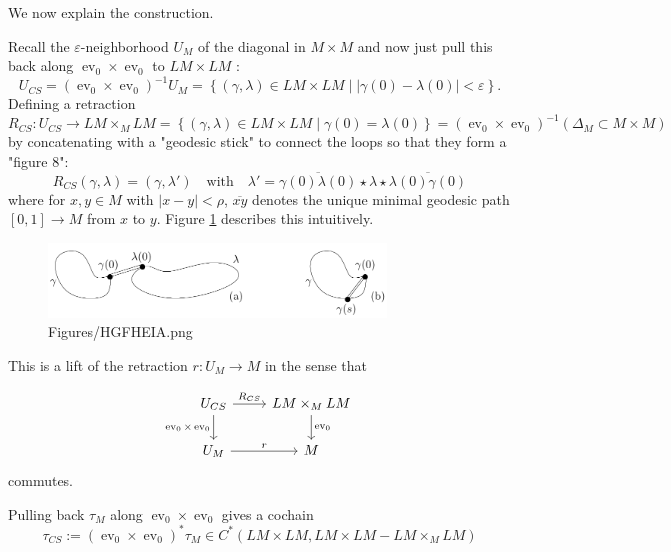 \documentclass[reqno]{amsart}
\theoremstyle{definition}
\theoremstyle{remark}
\DeclareMathOperator{\ev}{ev}
\begin{document}
We now explain the construction.

Recall the $\varepsilon$-neighborhood $U_M$ of the diagonal
in $M \times M$ and now just pull this back along
$\ev_0 \times \ev_0$
 to $LM \times LM$ :
 \[
 U_{CS} = \left( \ev_0 \times \ev_0 \right)^{-1} U_M = 
 \left\{ \left( \gamma, \lambda \right) \in LM \times LM  \mid 
 \left| \gamma(0) - \lambda(0) \right| < \varepsilon \right\} .
 \] 
 Defining a retraction
 \[
 R_{CS} \colon U_{CS} \to LM \times_M LM = 
 \left\{ \left( \gamma, \lambda \right) \in LM \times LM  \mid 
 \gamma(0) = \lambda(0) \right\} = 
 \left( \ev_0 \times \ev_0 \right)^{-1} \left( \Delta_M \subset 
 M \times M \right) 
 \] 
 by concatenating with a "geodesic stick" to connect the loops
 so that they form a "figure 8":
 \[
 R_{CS}\left( \gamma, \lambda \right) = 
 \left( \gamma, \lambda' \right) \quad \text{with} \quad
 \lambda' = \overline{\gamma(0) \lambda(0)} \star \lambda
 \star \overline{\lambda(0) \gamma(0)}
 \] 
 where for $x,y \in M$ with $\left| x-y \right| < \rho$,
 $\overline{xy}$ denotes the unique minimal geodesic path
 $\left[ 0,1 \right] \to M$ from $x$ to $y$.
 Figure \ref{fig:Figures-HGFHEIA-png} describes this intuitively.

 \begin{figure}[htpb]
     \centering
     \includegraphics[width=0.8\textwidth]{Figures/HGFHEIA.png}
     \caption{Figures/HGFHEIA.png}
     \label{fig:Figures-HGFHEIA-png}
 \end{figure}

 This is a lift of the retraction $r \colon U_M \to M$ in the sense that

 \begin{equation*}
 \begin{tikzcd}
     U_{CS} \ar[d, "\ev_0 \times \ev_0"'] \ar[r, "R_{CS}"] & 
     LM \times_M LM \ar[d, "\ev_0"] \\
     U_M \ar[r, "r"] & M
 \end{tikzcd}
 \end{equation*}
 commutes.
 
 Pulling back $\tau_M$ along $\ev_0 \times \ev_0$ gives a cochain
 \[
 \tau_{CS} := \left( \ev_0 \times \ev_0 \right)^{*} \tau_M
 \in C^{*} \left( LM \times LM, LM \times LM - LM \times_M LM \right) 
 \] 
 
\end{document}
